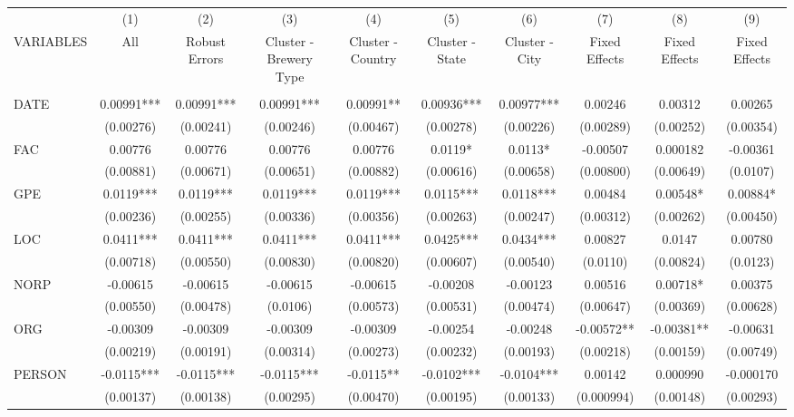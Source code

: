 \begin{tabular}{lccccccccc} \hline
    & (1) & (2) & (3) & (4) & (5) & (6) & (7) & (8) & (9) \\
   VARIABLES & All & Robust Errors & Cluster - Brewery Type & Cluster - Country & Cluster - State & Cluster - City & Fixed Effects & Fixed Effects & Fixed Effects \\ \hline
    &  &  &  &  &  &  &  &  &  \\
   DATE & 0.00991*** & 0.00991*** & 0.00991*** & 0.00991** & 0.00936*** & 0.00977*** & 0.00246 & 0.00312 & 0.00265 \\
    & (0.00276) & (0.00241) & (0.00246) & (0.00467) & (0.00278) & (0.00226) & (0.00289) & (0.00252) & (0.00354) \\
   FAC & 0.00776 & 0.00776 & 0.00776 & 0.00776 & 0.0119* & 0.0113* & -0.00507 & 0.000182 & -0.00361 \\
    & (0.00881) & (0.00671) & (0.00651) & (0.00882) & (0.00616) & (0.00658) & (0.00800) & (0.00649) & (0.0107) \\
   GPE & 0.0119*** & 0.0119*** & 0.0119*** & 0.0119*** & 0.0115*** & 0.0118*** & 0.00484 & 0.00548* & 0.00884* \\
    & (0.00236) & (0.00255) & (0.00336) & (0.00356) & (0.00263) & (0.00247) & (0.00312) & (0.00262) & (0.00450) \\
   LOC & 0.0411*** & 0.0411*** & 0.0411*** & 0.0411*** & 0.0425*** & 0.0434*** & 0.00827 & 0.0147 & 0.00780 \\
    & (0.00718) & (0.00550) & (0.00830) & (0.00820) & (0.00607) & (0.00540) & (0.0110) & (0.00824) & (0.0123) \\
   NORP & -0.00615 & -0.00615 & -0.00615 & -0.00615 & -0.00208 & -0.00123 & 0.00516 & 0.00718* & 0.00375 \\
    & (0.00550) & (0.00478) & (0.0106) & (0.00573) & (0.00531) & (0.00474) & (0.00647) & (0.00369) & (0.00628) \\
   ORG & -0.00309 & -0.00309 & -0.00309 & -0.00309 & -0.00254 & -0.00248 & -0.00572** & -0.00381** & -0.00631 \\
    & (0.00219) & (0.00191) & (0.00314) & (0.00273) & (0.00232) & (0.00193) & (0.00218) & (0.00159) & (0.00749) \\
   PERSON & -0.0115*** & -0.0115*** & -0.0115*** & -0.0115** & -0.0102*** & -0.0104*** & 0.00142 & 0.000990 & -0.000170 \\
    & (0.00137) & (0.00138) & (0.00295) & (0.00470) & (0.00195) & (0.00133) & (0.000994) & (0.00148) & (0.00293) \\

\end{tabular}
